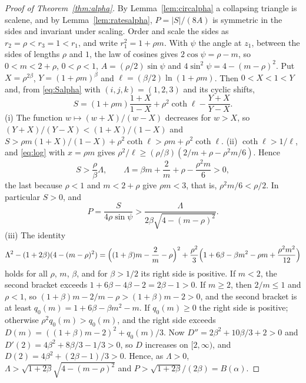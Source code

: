 \documentclass[11pt]{article}
\theoremstyle{definition}
\begin{document}
\begin{proof}[Proof of Theorem~\ref{thm:alpha}]
By Lemma~\ref{lem:circalpha} a collapsing triangle is scalene, and by Lemma~\ref{lem:ratesalpha}, $P = |S|/(8A)$ is symmetric in the sides and invariant under scaling. Order and scale the sides as $r_2 = \rho < r_3 = 1 < r_1$, and write $r_1^2 = 1 + \rho m$. With $\psi$ the angle at $z_1$, between the sides of lengths $\rho$ and $1$, the law of cosines gives $2\cos\psi = \rho - m$, so $0 < m < 2 + \rho$, $0 < \rho < 1$, $A = (\rho/2)\sin\psi$ and $4\sin^2\psi = 4 - (m - \rho)^2$. Put $X = \rho^{2\beta}$, $Y = (1 + \rho m)^\beta$ and $\ell = (\beta/2)\ln(1 + \rho m)$. Then $0 < X < 1 < Y$ and, from \eqref{eq:Salpha} with $(i, j, k) = (1, 2, 3)$ and its cyclic shifts,
\[
S = (1 + \rho m)\frac{1 + X}{1 - X} + \rho^2\coth\ell - \frac{Y + X}{Y - X}.
\]
(i) The function $w \mapsto (w + X)/(w - X)$ decreases for $w > X$, so $(Y + X)/(Y - X) < (1 + X)/(1 - X)$ and $S > \rho m(1 + X)/(1 - X) + \rho^2\coth\ell > \rho m + \rho^2\coth\ell$. (ii) $\coth\ell > 1/\ell$, and \eqref{eq:log} with $x = \rho m$ gives $\rho^2/\ell \ge (\rho/\beta)(2/m + \rho - \rho^2 m/6)$. Hence
\[
S > \frac{\rho}{\beta}\Lambda, \qquad \Lambda = \beta m + \frac{2}{m} + \rho - \frac{\rho^2 m}{6} > 0,
\]
the last because $\rho < 1$ and $m < 2 + \rho$ give $\rho m < 3$, that is, $\rho^2 m/6 < \rho/2$. In particular $S > 0$, and
\[
P = \frac{S}{4\rho\sin\psi} > \frac{\Lambda}{2\beta\sqrt{4 - (m - \rho)^2}}.
\]
(iii) The identity
\begin{equation}\label{eq:id}
\Lambda^2 - (1 + 2\beta)(4 - (m - \rho)^2) = \Bigl((1 + \beta)m - \frac2m - \rho\Bigr)^2 + \frac{\rho^2}{3}\Bigl(1 + 6\beta - \beta m^2 - \rho m + \frac{\rho^2 m^2}{12}\Bigr)
\end{equation}
holds for all $\rho$, $m$, $\beta$, and for $\beta > 1/2$ its right side is positive. If $m < 2$, the second bracket exceeds $1 + 6\beta - 4\beta - 2 = 2\beta - 1 > 0$. If $m \ge 2$, then $2/m \le 1$ and $\rho < 1$, so $(1 + \beta)m - 2/m - \rho > (1 + \beta)m - 2 > 0$, and the second bracket is at least $q_0(m) = 1 + 6\beta - \beta m^2 - m$. If $q_0(m) \ge 0$ the right side is positive; otherwise $\rho^2 q_0(m) > q_0(m)$, and the right side exceeds $D(m) = ((1 + \beta)m - 2)^2 + q_0(m)/3$. Now $D'' = 2\beta^2 + 10\beta/3 + 2 > 0$ and $D'(2) = 4\beta^2 + 8\beta/3 - 1/3 > 0$, so $D$ increases on $[2, \infty)$, and $D(2) = 4\beta^2 + (2\beta - 1)/3 > 0$. Hence, as $\Lambda > 0$, $\Lambda > \sqrt{1 + 2\beta}\sqrt{4 - (m - \rho)^2}$ and $P > \sqrt{1 + 2\beta}/(2\beta) = B(\alpha)$.


\end{proof}
\end{document}
